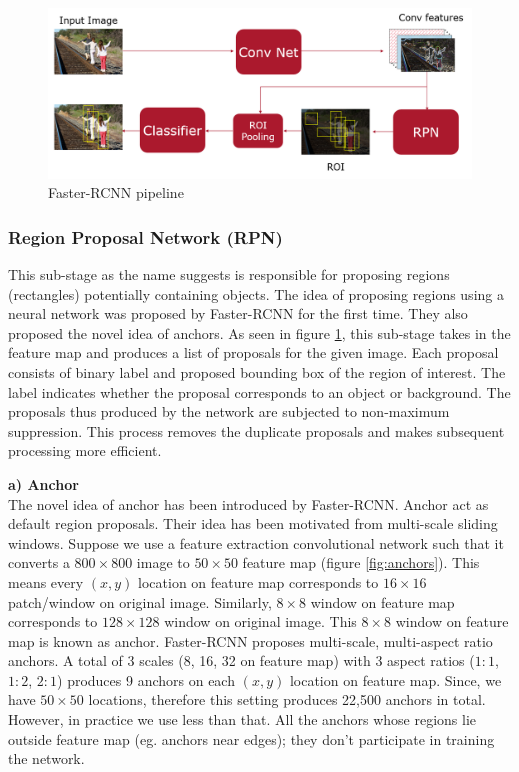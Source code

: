 \begin{figure}
    \centering
    \includegraphics[width=\linewidth]{images/faster-rcnn-pipeline.PNG}
    \caption[Faster-RCNN pipeline]{Faster-RCNN pipeline}
    \label{fig:faster-rcnn-pipeline}
\end{figure}

\subsubsection{Region Proposal Network (RPN)}
\label{sec:RPN}
This sub-stage as the name suggests is responsible for proposing regions (rectangles) potentially containing objects. The idea of proposing regions using a neural network was proposed by Faster-RCNN for the first time. They also proposed the novel idea of anchors. As seen in figure \ref{fig:faster-rcnn-pipeline}, this sub-stage takes in the feature map and produces a list of proposals for the given image. Each proposal consists of binary label and proposed bounding box of the region of interest. The label indicates whether the proposal corresponds to an object or background. The proposals thus produced by the network are subjected to non-maximum suppression. This process removes the duplicate proposals and makes subsequent processing more efficient.  

\textbf{a) Anchor} \\
The novel idea of anchor has been introduced by Faster-RCNN. Anchor act as default region proposals. Their idea has been motivated from multi-scale sliding windows. Suppose we use a feature extraction convolutional network such that it converts a $800\times800$ image to $50\times50$ feature map (figure \ref{fig:anchors}). This means every $(x,y)$ location on feature map corresponds to $16\times16$ patch/window on original image. Similarly, $8\times8$ window on feature map corresponds to $128\times128$ window on original image. This $8\times8$ window on feature map is known as anchor. Faster-RCNN proposes multi-scale, multi-aspect ratio anchors. A total of 3 scales (8, 16, 32 on feature map) with 3 aspect ratios ($1:1$, $1:2$, $2:1$) produces 9 anchors on each $(x,y)$ location on feature map. Since, we have $50\times50$ locations, therefore this setting produces 22,500 anchors in total. However, in practice we use less than that. All the anchors whose regions lie outside feature map (eg. anchors near edges); they don't participate in training the network. 

